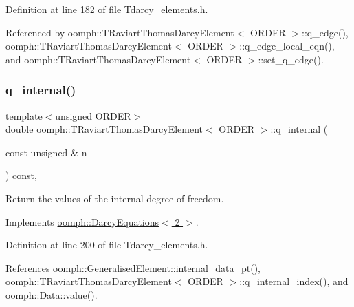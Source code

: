 Definition at line 182 of file Tdarcy\+\_\+elements.\+h.



Referenced by oomph\+::\+T\+Raviart\+Thomas\+Darcy\+Element$<$ O\+R\+D\+E\+R $>$\+::q\+\_\+edge(), oomph\+::\+T\+Raviart\+Thomas\+Darcy\+Element$<$ O\+R\+D\+E\+R $>$\+::q\+\_\+edge\+\_\+local\+\_\+eqn(), and oomph\+::\+T\+Raviart\+Thomas\+Darcy\+Element$<$ O\+R\+D\+E\+R $>$\+::set\+\_\+q\+\_\+edge().

\mbox{\label{classoomph_1_1TRaviartThomasDarcyElement_a613264c01085a511a3c30f3f78f00c50}} 
\subsubsection{\texorpdfstring{q\+\_\+internal()}{q\_internal()}}
{\footnotesize\ttfamily template$<$unsigned O\+R\+D\+ER$>$ \\
double \hyperlink{classoomph_1_1TRaviartThomasDarcyElement}{oomph\+::\+T\+Raviart\+Thomas\+Darcy\+Element}$<$ O\+R\+D\+ER $>$\+::q\+\_\+internal (\begin{DoxyParamCaption}\item[{const unsigned \&}]{n }\end{DoxyParamCaption}) const\hspace{0.3cm}{\ttfamily [inline]}, {\ttfamily [virtual]}}



Return the values of the internal degree of freedom. 



Implements \hyperlink{classoomph_1_1DarcyEquations_af92e9914e062e894514cca6a7cec0a26}{oomph\+::\+Darcy\+Equations$<$ 2 $>$}.



Definition at line 200 of file Tdarcy\+\_\+elements.\+h.



References oomph\+::\+Generalised\+Element\+::internal\+\_\+data\+\_\+pt(), oomph\+::\+T\+Raviart\+Thomas\+Darcy\+Element$<$ O\+R\+D\+E\+R $>$\+::q\+\_\+internal\+\_\+index(), and oomph\+::\+Data\+::value().

\mbox{\label{classoomph_1_1TRaviartThomasDarcyElement_a3ee981ece6c2ac5a61a1fc5c75159496}} 
